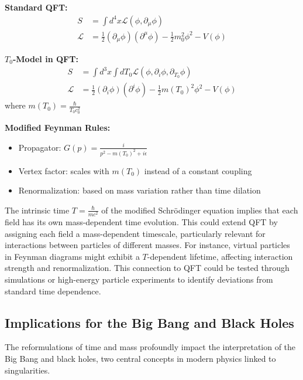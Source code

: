 \documentclass[a4paper,12pt]{article}
\begin{document}
	\begin{tcolorbox}[colback=yellow!5!white,colframe=yellow!75!black,title=Reformulation of QFT Concepts]
		\textbf{Standard QFT:}
		\begin{align}
			S &= \int d^4x \mathcal{L}(\phi, \partial_\mu\phi) \\
			\mathcal{L} &= \frac{1}{2}(\partial_\mu\phi)(\partial^\mu\phi) - \frac{1}{2}m_0^2\phi^2 - V(\phi)
		\end{align}
		
		\textbf{$T_0$-Model in QFT:}
		\begin{align}
			S &= \int d^3x \int dT_0 \mathcal{L}(\phi, \partial_i\phi, \partial_{T_0}\phi) \\
			\mathcal{L} &= \frac{1}{2}(\partial_i\phi)(\partial^i\phi) - \frac{1}{2}m(T_0)^2\phi^2 - V(\phi)
		\end{align}
		where $m(T_0) = \frac{\hbar}{T_0 c_0^2}$
		
		\textbf{Modified Feynman Rules:}
		\begin{itemize}
			\item Propagator: $G(p) = \frac{i}{p^2 - m(T_0)^2 + i\epsilon}$
			\item Vertex factor: scales with $m(T_0)$ instead of a constant coupling
			\item Renormalization: based on mass variation rather than time dilation
		\end{itemize}
	\end{tcolorbox}
	
	The intrinsic time \( T = \frac{\hbar}{m c^2} \) of the modified Schrödinger equation implies that each field has its own mass-dependent time evolution. This could extend QFT by assigning each field a mass-dependent timescale, particularly relevant for interactions between particles of different masses. For instance, virtual particles in Feynman diagrams might exhibit a \( T \)-dependent lifetime, affecting interaction strength and renormalization. This connection to QFT could be tested through simulations or high-energy particle experiments to identify deviations from standard time dependence.
	
	\subsection{Implications for the Big Bang and Black Holes}
	The reformulations of time and mass profoundly impact the interpretation of the Big Bang and black holes, two central concepts in modern physics linked to singularities.
	
\end{document}
